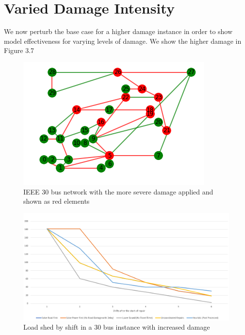 \section{Varied Damage Intensity}
We now perturb the base case for a higher damage instance in order to show model effectiveness for varying levels of damage. We show the higher damage in Figure 3.7
\begin{figure}[htbp]
	\centering
	\includegraphics[width=.9\linewidth]{30BusSevereDamage.png}
	\caption{IEEE 30 bus network with the more severe damage applied and shown as red elements}
	\label{fig:sub2}
	
	
\end{figure}
\begin{figure}[htbp]
	\centering
	\includegraphics[width=.9\linewidth]{Rplot30scenario2.png}
	\caption{Load shed by shift in a 30 bus instance with increased damage}
	\label{fig:sub2}
	
	
\end{figure}
\begin{table}[htbp]
	\centering
	\caption{Total load shed over the repair horizon for the increased damage instance}
	
	\label{time}
\end{table}

